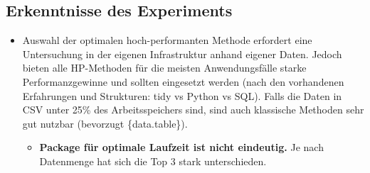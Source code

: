 \documentclass[
  german,
  10pt,
  twoside]{article}
\providecommand{\tightlist}{%
  \setlength{\itemsep}{0pt}\setlength{\parskip}{0pt}}
\begin{document}
\subsection{Erkenntnisse des
Experiments}\label{erkenntnisse-des-experiments}

\begin{itemize}
\tightlist
\item
  Auswahl der optimalen hoch-performanten Methode erfordert eine
  Untersuchung in der eigenen Infrastruktur anhand eigener Daten. Jedoch
  bieten alle HP-Methoden für die meisten Anwendungsfälle starke
  Performanzgewinne und sollten eingesetzt werden (nach den vorhandenen
  Erfahrungen und Strukturen: tidy vs Python vs SQL). Falls die Daten in
  CSV unter 25\% des Arbeitsspeichers sind, sind auch klassische
  Methoden sehr gut nutzbar (bevorzugt \{data.table\}).

  \begin{itemize}
  \tightlist
  \item
    \textbf{Package für optimale Laufzeit ist nicht eindeutig.} Je nach
    Datenmenge hat sich die Top 3 stark unterschieden.


\end{itemize}
\end{itemize}
\end{document}
